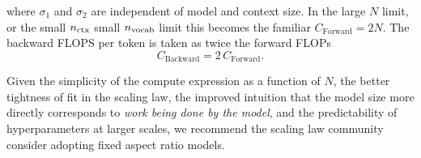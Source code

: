 where $\sigma_1$ and $\sigma_2$ are independent of model and context size.
In the large $N$ limit, or the small $n_\text{ctx}$ small $n_\text{vocab}$ limit this becomes the familiar $C_\text{Forward} = 2N$.
The backward FLOPS per token is taken as twice the forward FLOPs \citep{DBLP:journals/corr/abs-2403-14606}
\begin{equation}
	C_\text{Backward} = 2\,C_\text{Forward}.
\end{equation}

Given the simplicity of the compute expression as a function of $N$,
the better tightness of fit in the scaling law,
the improved intuition that the model size more directly corresponds to \emph{work being done by the model}, 
and the predictability of hyperparameters at larger scales,
we recommend the scaling law community consider adopting fixed aspect ratio models.






